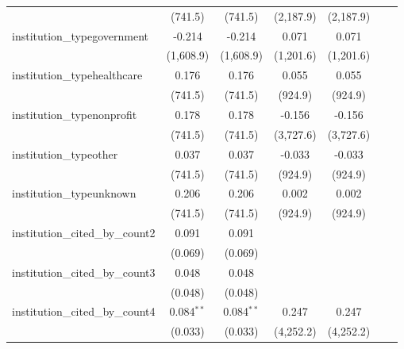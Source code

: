 \begin{tabular}{lcccccc}
                                         & (741.5)      & (741.5)      & (2,187.9)      & (2,187.9)      &     &   \\   
   institution\_typegovernment           & -0.214       & -0.214       & 0.071          & 0.071          &     &   \\   
                                         & (1,608.9)    & (1,608.9)    & (1,201.6)      & (1,201.6)      &     &   \\   
   institution\_typehealthcare           & 0.176        & 0.176        & 0.055          & 0.055          &     &   \\   
                                         & (741.5)      & (741.5)      & (924.9)        & (924.9)        &     &   \\   
   institution\_typenonprofit            & 0.178        & 0.178        & -0.156         & -0.156         &     &   \\   
                                         & (741.5)      & (741.5)      & (3,727.6)      & (3,727.6)      &     &   \\   
   institution\_typeother                & 0.037        & 0.037        & -0.033         & -0.033         &     &   \\   
                                         & (741.5)      & (741.5)      & (924.9)        & (924.9)        &     &   \\   
   institution\_typeunknown              & 0.206        & 0.206        & 0.002          & 0.002          &     &   \\   
                                         & (741.5)      & (741.5)      & (924.9)        & (924.9)        &     &   \\   
   institution\_cited\_by\_count2        & 0.091        & 0.091        &                &                &     &   \\   
                                         & (0.069)      & (0.069)      &                &                &     &   \\   
   institution\_cited\_by\_count3        & 0.048        & 0.048        &                &                &     &   \\   
                                         & (0.048)      & (0.048)      &                &                &     &   \\   
   institution\_cited\_by\_count4        & 0.084$^{**}$ & 0.084$^{**}$ & 0.247          & 0.247          &     &   \\   
                                         & (0.033)      & (0.033)      & (4,252.2)      & (4,252.2)      &     &   \\   

\end{tabular}
